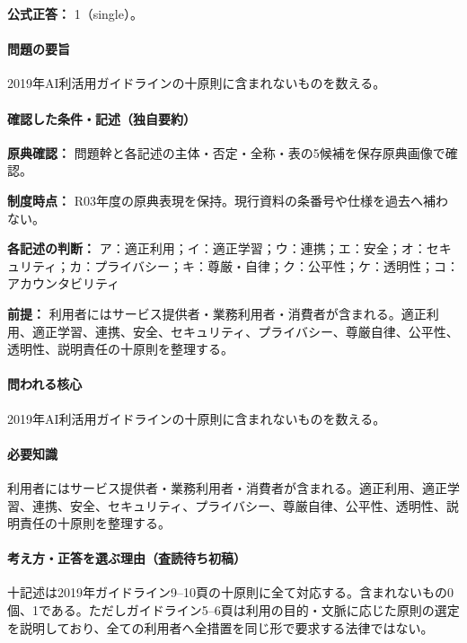 \textbf{公式正答：} 1（single）。

\paragraph{問題の要旨} 2019年AI利活用ガイドラインの十原則に含まれないものを数える。

\paragraph{確認した条件・記述（独自要約）}\mbox{}\par

\noindent\textbf{原典確認：} 問題幹と各記述の主体・否定・全称・表の5候補を保存原典画像で確認。\par

\noindent\textbf{制度時点：} R03年度の原典表現を保持。現行資料の条番号や仕様を過去へ補わない。\par

\noindent\textbf{各記述の判断：} ア：適正利用；イ：適正学習；ウ：連携；エ：安全；オ：セキュリティ；カ：プライバシー；キ：尊厳・自律；ク：公平性；ケ：透明性；コ：アカウンタビリティ\par

\noindent\textbf{前提：} 利用者にはサービス提供者・業務利用者・消費者が含まれる。適正利用、適正学習、連携、安全、セキュリティ、プライバシー、尊厳自律、公平性、透明性、説明責任の十原則を整理する。\par

\paragraph{問われる核心} 2019年AI利活用ガイドラインの十原則に含まれないものを数える。

\paragraph{必要知識} 利用者にはサービス提供者・業務利用者・消費者が含まれる。適正利用、適正学習、連携、安全、セキュリティ、プライバシー、尊厳自律、公平性、透明性、説明責任の十原則を整理する。

\paragraph{考え方・正答を選ぶ理由（査読待ち初稿）} 十記述は2019年ガイドライン9--10頁の十原則に全て対応する。含まれないもの0個、1である。ただしガイドライン5--6頁は利用の目的・文脈に応じた原則の選定を説明しており、全ての利用者へ全措置を同じ形で要求する法律ではない。

